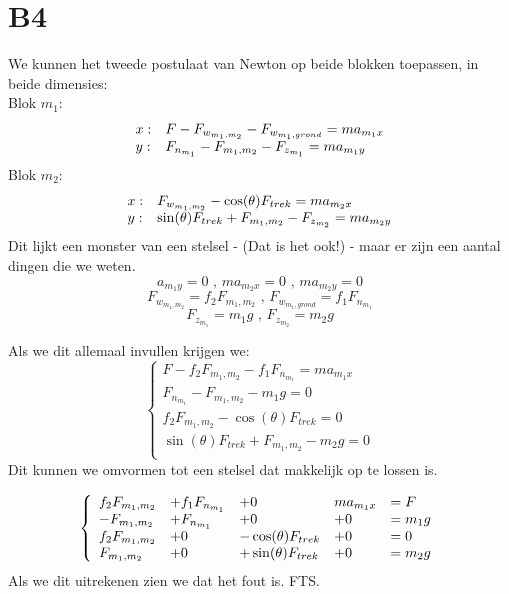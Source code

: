\documentclass[10pt,a4paper]{article}
\begin{document}
\section*{B4}
We kunnen het tweede postulaat van Newton op beide blokken toepassen, in beide dimensies:\\
Blok $m_1$:
\[
\begin{array}{l l}
x: & F - F_{w_{m_1,m_2}} - F_{w_{m_1,grond}} = m a_{m_1x}\\
y: & F_{n_{m_1}} -F_{m_1,m_2} - F_{z_{m_1}} = m a_{m_1y}\\
\end{array}
\]
Blok $m_2$:
\[
\begin{array}{l l}
x: & F_{w_{m_1,m_2}} - \cos(\theta)F_{trek} = m a_{m_2x}\\
y: & \sin(\theta)F_{trek} + F_{m_1,m_2} - F_{z_{m_2}} = m a_{m_2y}\\
\end{array}
\]
Dit lijkt een monster van een stelsel - (Dat is het ook!) - maar er zijn een aantal dingen die we weten.
\[
a_{m_1y} = 0 \text{ ,  } m a_{m_2x}=0 \text{ ,  }  m a_{m_2y}=0
\]
\[
F_{w_{m_1,m_2}} = f_2 F_{m_1,m_2} \text{ ,  }F_{w_{m_1,grond}} = f_1 F_{n_{m_1}}
\]
\[
F_{z_{m_1}} = m_1 g \text{ ,  } F_{z_{m_2}} = m_2 g
\]

Als we dit allemaal invullen krijgen we:
\[
\left\lbrace
\begin{array}{l}
F - f_2 F_{m_1,m_2} - f_1 F_{n_{m_1}} = m a_{m_1x}\\
F_{n_{m_1}} - F_{m_1,m_2} -  m_1 g  = 0\\
f_2 F_{m_1,m_2} - \cos(\theta)F_{trek} = 0\\
\sin(\theta)F_{trek} + F_{m_1,m_2} - m_2 g = 0\\
\end{array}
\right.
\]
Dit kunnen we omvormen tot een stelsel dat makkelijk op te lossen is.

\[
\left\lbrace
\begin{array}{l l l l l}
f_2 F_{m_1,m_2} &+ f_1 F_{n_{m_1}} &+ 0 & m a_{m_1x} &=F\\
- F_{m_1,m_2} &+ F_{n_{m_1}}  &+ 0 &+ 0 &= m_1 g\\
f_2 F_{m_1,m_2} &+ 0 &- \cos(\theta)F_{trek} &+ 0 &= 0\\
F_{m_1,m_2} &+ 0 &+\sin(\theta)F_{trek} &+ 0 &= m_2 g\\
\end{array}
\right.
\]
Als we dit uitrekenen zien we dat het fout is. FTS.
\end{document}
